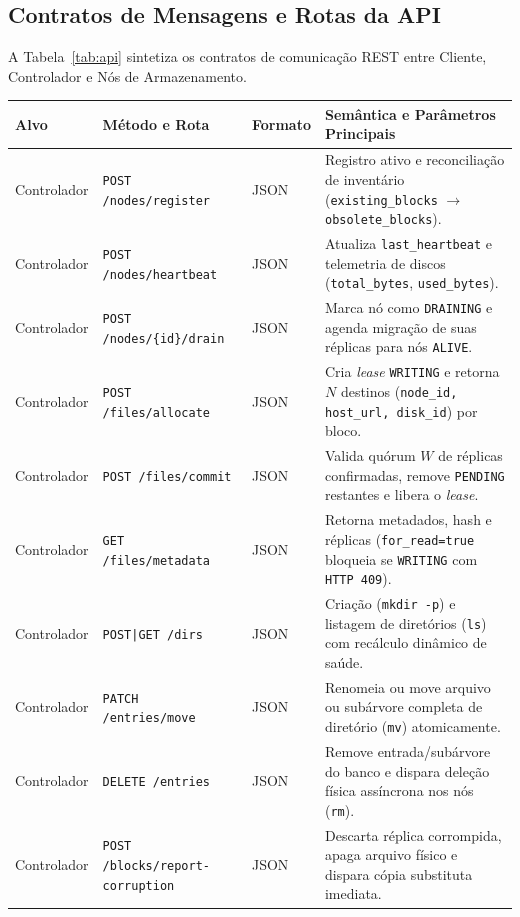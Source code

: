 \documentclass[10pt,a4paper]{article}
\begin{document}
\subsection{Contratos de Mensagens e Rotas da API}
A Tabela~\ref{tab:api} sintetiza os contratos de comunicação REST entre Cliente, Controlador e Nós de Armazenamento.

\begin{table}[!htbp]
\centering
\footnotesize
\renewcommand{\arraystretch}{1.1}
\begin{tabularx}{\textwidth}{l l l Y}
\toprule
\textbf{Alvo} & \textbf{Método e Rota} & \textbf{Formato} & \textbf{Semântica e Parâmetros Principais} \\
\midrule
Controlador & \texttt{POST /nodes/register} & JSON & Registro ativo e reconciliação de inventário (\texttt{existing\_blocks} $\rightarrow$ \texttt{obsolete\_blocks}). \\
Controlador & \texttt{POST /nodes/heartbeat} & JSON & Atualiza \texttt{last\_heartbeat} e telemetria de discos (\texttt{total\_bytes}, \texttt{used\_bytes}). \\
Controlador & \texttt{POST /nodes/\{id\}/drain} & JSON & Marca nó como \texttt{DRAINING} e agenda migração de suas réplicas para nós \texttt{ALIVE}. \\
Controlador & \texttt{POST /files/allocate} & JSON & Cria \textit{lease} \texttt{WRITING} e retorna $N$ destinos (\texttt{node\_id, host\_url, disk\_id}) por bloco. \\
Controlador & \texttt{POST /files/commit} & JSON & Valida quórum $W$ de réplicas confirmadas, remove \texttt{PENDING} restantes e libera o \textit{lease}. \\
Controlador & \texttt{GET /files/metadata} & JSON & Retorna metadados, hash e réplicas (\texttt{for\_read=true} bloqueia se \texttt{WRITING} com \texttt{HTTP 409}). \\
Controlador & \texttt{POST|GET /dirs} & JSON & Criação (\texttt{mkdir -p}) e listagem de diretórios (\texttt{ls}) com recálculo dinâmico de saúde. \\
Controlador & \texttt{PATCH /entries/move} & JSON & Renomeia ou move arquivo ou subárvore completa de diretório (\texttt{mv}) atomicamente. \\
Controlador & \texttt{DELETE /entries} & JSON & Remove entrada/subárvore do banco e dispara deleção física assíncrona nos nós (\texttt{rm}). \\
Controlador & \texttt{POST /blocks/report-corruption} & JSON & Descarta réplica corrompida, apaga arquivo físico e dispara cópia substituta imediata. \\

\end{tabularx}
\end{table}
\end{document}

